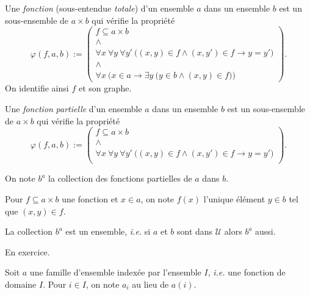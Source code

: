 \documentclass[./main]{subfiles}
\begin{document}
  \begin{defn}
    Une \textit{fonction} (sous-entendue \textit{totale}) d'un ensemble $a$ dans un ensemble $b$ est un sous-ensemble de $a \times b$ qui vérifie la propriété
    \[
    \varphi(f, a, b) := 
    \begin{pmatrix} 
      f \subseteq a \times b\\
      \land\\
      \forall x \: \forall  y \: \forall y' \: \big((x, y )\in f \land (x, y') \in f  \to y = y'\big)\\
      \land\\
      \forall x \: \big(x \in a \to \exists y \: \big(y \in b \land (x,y) \in f\big)\big)
    \end{pmatrix}
    .\]
    On identifie ainsi $f$ et son graphe.


    Une \textit{fonction} \textit{partielle} d'un ensemble $a$ dans un ensemble $b$ est un sous-ensemble de $a \times b$ qui vérifie la propriété
    \[
    \varphi(f, a, b) := 
    \begin{pmatrix} 
      f \subseteq a \times b\\
      \land\\
      \forall x \: \forall  y \: \forall y' \: \big((x, y )\in f \land (x, y') \in f  \to y = y'\big)\\
    \end{pmatrix}
    .\]

    On note $b^a$ la collection des fonctions partielles de $a$ dans $b$.
  \end{defn}

  \begin{nota}
    Pour $f \subseteq a \times b$ une fonction et $x \in a$, on note $f(x)$ l'unique élément $y \in b$ tel que $(x, y) \in f$.
  \end{nota}

  \begin{prop}
    La collection $b^a$ est un ensemble, \textit{i.e.} si $a$ et $b$ sont dans $\mathcal{U}$ alors $b^a$ aussi.
  \end{prop}
  \begin{prv}
    En exercice.
  \end{prv}

  \begin{nota}
    Soit $a$ une famille d'ensemble indexée par l'ensemble $I$, \textit{i.e.} une fonction de domaine $I$.
    Pour $i \in I$, on note $a_i$ au lieu de $a(i)$.
  \end{nota}
\end{document}
